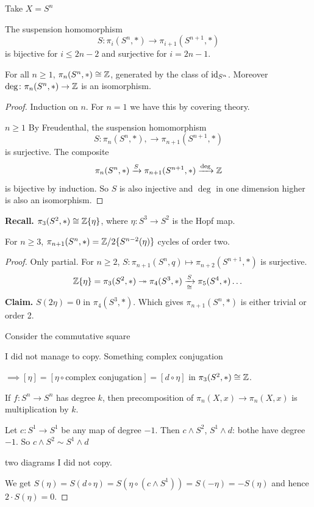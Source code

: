 \documentclass[language=english]{TemplateLecture}
\begin{document}
Take \(X = S^n\)
\begin{corollary}
    The suspension homomorphism
    \[S\colon \pi_i(S^n, *) \to \pi_{i+1}(S^{n+1}, *)\]
    is bijective for \(i \leq 2n-2\) and surjective for \(i = 2n-1\).
\end{corollary}

\begin{corollary}
    For all \(n \geq 1\), \(\pi_n(S^n, *)\cong \mathbb{Z}\), generated by the class of \(\operatorname{id}_{S^n}\). Moreover \(\deg\colon \pi_n(S^n, *)\to \mathbb{Z}\) is an isomorphism.
\end{corollary}

\begin{proof}
    Induction on \(n\). For \(n= 1\) we have this by covering theory.

    \(n\geq 1\) By Freudenthal, the suspension homomorphism
    \[S\colon \pi_n(S^n, *), \to \pi_{n+1}(S^{n+1}, *)\]
    is surjective. The composite
    \[\pi_n(S^n, *) \xrightarrow{S} \pi_{n+1}(S^{n+1}, *) \xrightarrow{\deg} \mathbb{Z}\]
    is bijective by induction. So \(S\) is also injective and \(\deg\) in one dimension higher is also an isomorphism.
\end{proof}

\textbf{Recall.} \(\pi_3(S^2, *) \cong \mathbb{Z}\{\eta\}\), where \(\eta \colon S^3 \to S^2\) is the Hopf map.

\begin{proposition}
    For \(n \geq 3\), \(\pi_{n+1}(S^n, *) = \mathbb{Z}/2\{S^{n-2}(\eta)\}\) cycles of order two.
\end{proposition}

\begin{proof}
    Only partial. For \(n \geq 2\), \(S\colon \pi_{n+1}(S^n, q) \mapsto \pi_{n+2}(S^{n+1}, *)\) is surjective.
    \[\mathbb{Z}\{\eta\} = \pi_3(S^2, *) \twoheadrightarrow \pi_4(S^3, *) \xrightarrow[\cong]{S} \pi_5(S^4, *)\dots\]
    \textbf{Claim.} \(S(2\eta) = 0\) in \(\pi_4(S^3, *)\). Which gives \(\pi_{n+1}(S^n, *)\) is either trivial or order 2.

    Consider the commutative square

    I did not manage to copy. Something complex conjugation

    \(\implies [\eta] = [\eta \circ \text{complex conjugation}] = [d \circ \eta]\) in \(\pi_3(S^2, * )\cong \mathbb{Z}\).

    If \(f\colon S^n \to S^n\) has degree \(k\), then precomposition of \(\pi_n(X,x)\to \pi_n(X,x)\) is multiplication by \(k\).

    Let \(c\colon S^1\to S^1\) be any map of degree \(-1\). Then \(c\wedge S^2\), \(S^1 \wedge d\): bothe have degree \(-1\). So \(c \wedge S^2 \sim S^1 \wedge d\)

    two diagrams I did not copy.

    We get \(S(\eta) = S(d \circ \eta)=S(\eta \circ (c\wedge S^1)) = S(-\eta) = - S(\eta)\) and hence \(2 \cdot S(\eta) = 0\).
\end{proof}
\end{document}
